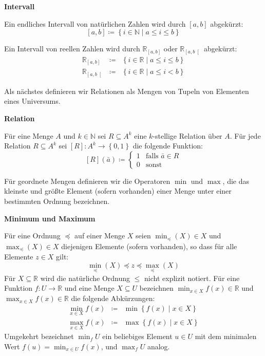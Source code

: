 \begin{defn}
\textbf{Intervall}

Ein endliches Intervall von natürlichen Zahlen wird durch $\left[a,b\right]$
abgekürzt:
\[
\left[a,b\right]\coloneqq\left\{ i\in\mathbb{N}\mid a\leqslant i\leqslant b\right\} 
\]

Ein Intervall von reellen Zahlen wird durch $\mathbb{R}_{\left[a,b\right]}$
oder $\mathbb{R}_{\left[a,b\right[}$ abgekürzt: 
\begin{eqnarray*}
\mathbb{R}_{\left[a,b\right]} & \coloneqq & \left\{ i\in\mathbb{R}\mid a\leqslant i\leqslant b\right\} \\
\mathbb{R}_{\left[a,b\right[} & \coloneqq & \left\{ i\in\mathbb{R}\mid a\leqslant i<b\right\} 
\end{eqnarray*}
\end{defn}
Als nächstes definieren wir Relationen als Mengen von Tupeln von Elementen
eines Universums. 
\begin{defn}
\textbf{\label{def:relation}Relation}

Für eine Menge $A$ und $k\in\mathbb{N}$ sei $R\subseteq A^{k}$
eine $k$-stellige Relation über $A$. Für jede Relation $R\subseteq A^{k}$
sei $\left[R\right]:A^{k}\rightarrow\left\{ 0,1\right\} $ die folgende
Funktion: 
\[
\left[R\right]\left(\bar{a}\right)\coloneqq\begin{cases}
1 & \mathrm{falls}\,\,\bar{a}\in R\\
0 & \mathrm{sonst}
\end{cases}
\]
\end{defn}
Für geordnete Mengen definieren wir die Operatoren $\min$ und $\max$,
die das kleinste und größte Element (sofern vorhanden) einer Menge
unter einer bestimmten Ordnung bezeichnen.
\begin{defn}
\textbf{Minimum und Maximum}

Für eine Ordnung $\preceq$ auf einer Menge $X$ seien $\min_{\preceq}\left(X\right)\in X$
und $\max_{\preceq}\left(X\right)\in X$ diejenigen Elemente (sofern
vorhanden), so dass für alle Elemente $z\in X$ gilt:
\[
\min_{\preceq}\left(X\right)\preceq z\preceq\max_{\preceq}\left(X\right)
\]
Für $X\subseteq\mathbb{R}$ wird die natürliche Ordnung $\leqslant$
nicht explizit notiert. Für eine Funktion $f:U\rightarrow\mathbb{R}$
und eine Menge $X\subseteq U$ bezeichnen $\min_{x\in X}f\left(x\right)\in\mathbb{R}$
und $\max_{x\in X}f\left(x\right)\in\mathbb{R}$ die folgende Abkürzungen:
\begin{eqnarray*}
\min_{x\in X}f\left(x\right) & \coloneqq & \min\left\{ f\left(x\right)\mid x\in X\right\} \\
\max_{x\in X}f\left(x\right) & \coloneqq & \max\left\{ f\left(x\right)\mid x\in X\right\} 
\end{eqnarray*}
Umgekehrt bezeichnet $\min_{f}U$ ein beliebiges Element $u\in U$
mit dem minimalen Wert $f\left(u\right)=\min_{x\in U}f\left(x\right)$,
und $\max_{f}U$ analog.
\end{defn}

